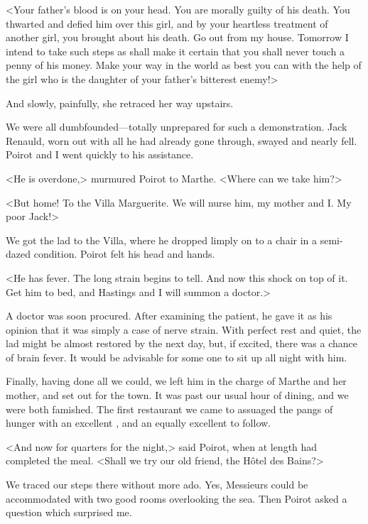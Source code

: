  <Your father's blood is on your head. You are morally guilty of his death. You thwarted and defied him over this girl, and by your heartless treatment of another girl, you brought about his death. Go out from my house. Tomorrow I intend to take such steps as shall make it certain that you shall never touch a penny of his money. Make your way in the world as best you can with the help of the girl who is the daughter of your father's bitterest enemy!> 

 And slowly, painfully, she retraced her way upstairs. 

 We were all dumbfounded—totally unprepared for such a demonstration. Jack Renauld, worn out with all he had already gone through, swayed and nearly fell. Poirot and I went quickly to his assistance. 

 <He is overdone,> murmured Poirot to Marthe. <Where can we take him?> 

 <But home! To the Villa Marguerite. We will nurse him, my mother and I. My poor Jack!> 

 We got the lad to the Villa, where he dropped limply on to a chair in a semi-dazed condition. Poirot felt his head and hands. 

 <He has fever. The long strain begins to tell. And now this shock on top of it. Get him to bed, and Hastings and I will summon a doctor.> 

 A doctor was soon procured. After examining the patient, he gave it as his opinion that it was simply a case of nerve strain. With perfect rest and quiet, the lad might be almost restored by the next day, but, if excited, there was a chance of brain fever. It would be advisable for some one to sit up all night with him. 

 Finally, having done all we could, we left him in the charge of Marthe and her mother, and set out for the town. It was past our usual hour of dining, and we were both famished. The first restaurant we came to assuaged the pangs of hunger with an excellent , and an equally excellent  to follow. 

 <And now for quarters for the night,> said Poirot, when at length  had completed the meal. <Shall we try our old friend, the Hôtel des Bains?> 

 We traced our steps there without more ado. Yes, Messieurs could be accommodated with two good rooms overlooking the sea. Then Poirot asked a question which surprised me. 

